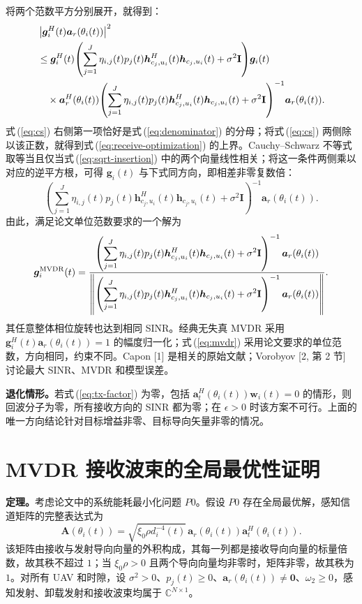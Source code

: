 \documentclass[11pt,a4paper]{ctexart}
\begin{document}
将两个范数平方分别展开，就得到：
\begin{align}
&\left|\bm g_i^H(t)\bm a_r(\theta_i(t))\right|^2\notag\\
&\le\bm g_i^H(t)\!\left(\sum_{j=1}^J\eta_{i,j}(t)p_j(t)
\bm h_{c_j,u_i}^{H}(t)\bm h_{c_j,u_i}(t)+\sigma^2\mathbf I\right)\!\bm g_i(t)\notag\\
&\quad\times\bm a_r^H(\theta_i(t))\!\left(\sum_{j=1}^J\eta_{i,j}(t)p_j(t)
\bm h_{c_j,u_i}^{H}(t)\bm h_{c_j,u_i}(t)+\sigma^2\mathbf I\right)^{-1}\!\bm a_r(\theta_i(t)).\label{eq:cs}
\end{align}
式\,(\ref{eq:cs}) 右侧第一项恰好是式\,(\ref{eq:denominator}) 的分母；将式\,(\ref{eq:cs}) 两侧除以该正数，就得到式\,(\ref{eq:receive-optimization}) 的上界。Cauchy--Schwarz 不等式取等当且仅当式\,(\ref{eq:sqrt-insertion}) 中的两个向量线性相关；将这一条件两侧乘以对应的逆平方根，可得 $\bm g_i(t)$ 与下式同方向，即相差非零复数倍：
\begin{equation}\label{eq:direction}
\left(\sum_{j=1}^J\eta_{i,j}(t)p_j(t)
\bm h_{c_j,u_i}^{H}(t)\bm h_{c_j,u_i}(t)+\sigma^2\mathbf I\right)^{-1}
\bm a_r(\theta_i(t)).
\end{equation}
由此，满足论文单位范数要求的一个解为
\begin{equation}\label{eq:mvdr}
\bm g_i^{\rm MVDR}(t)=
\frac{\left(\displaystyle\sum_{j=1}^J\eta_{i,j}(t)p_j(t)
\bm h_{c_j,u_i}^{H}(t)\bm h_{c_j,u_i}(t)+\sigma^2\mathbf I\right)^{-1}
\bm a_r(\theta_i(t))}
{\left\|\left(\displaystyle\sum_{j=1}^J\eta_{i,j}(t)p_j(t)
\bm h_{c_j,u_i}^{H}(t)\bm h_{c_j,u_i}(t)+\sigma^2\mathbf I\right)^{-1}
\bm a_r(\theta_i(t))\right\|}.
\end{equation}
其任意整体相位旋转也达到相同 SINR。经典无失真 MVDR 采用 $\bm g_i^H(t)\bm a_r(\theta_i(t))=1$ 的幅度归一化；式\,(\ref{eq:mvdr}) 采用论文要求的单位范数，方向相同，约束不同。Capon [1] 是相关的原始文献；Vorobyov [2, 第 2 节] 讨论最大 SINR、MVDR 和模型误差。

\textbf{退化情形。}若式\,(\ref{eq:tx-factor}) 为零，包括 $\bm a_t^H(\theta_i(t))\bm w_i(t)=0$ 的情形，则回波分子为零，所有接收方向的 SINR 都为零；在 $\epsilon>0$ 时该方案不可行。上面的唯一方向结论针对目标增益非零、目标导向矢量非零的情况。

\section{MVDR 接收波束的全局最优性证明}

\noindent\textbf{定理。}考虑论文中的系统能耗最小化问题 $P0$。假设 $P0$ 存在全局最优解，感知信道矩阵的完整表达式为
\begin{equation}\label{eq:theorem-channel}
\mathbf A(\theta_i(t))=\sqrt{\xi_0\rho d_i^{-4}(t)}\,
\bm a_r(\theta_i(t))\bm a_t^H(\theta_i(t)).
\end{equation}
该矩阵由接收与发射导向向量的外积构成，其每一列都是接收导向向量的标量倍数，故其秩不超过 $1$；当 $\xi_0\rho>0$ 且两个导向向量均非零时，矩阵非零，故其秩为 $1$。对所有 UAV 和时隙，设 $\sigma^2>0$、$p_j(t)\ge0$、$\bm a_r(\theta_i(t))\ne\bm0$、$\omega_2\ge0$，感知发射、卸载发射和接收波束均属于 $\mathbb C^{N\times1}$。
\end{document}
